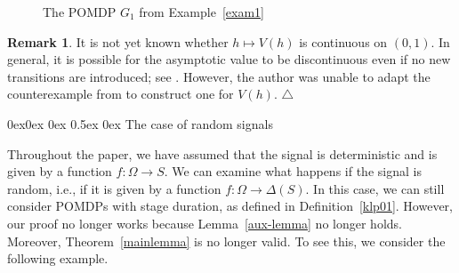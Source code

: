 \documentclass[english,openary,11pt]{article}
\makeatletter
\renewcommand\subsection{\@startsection{subsection}{2}{\z@}%
                                     {0ex\@plus 0ex \@minus 0ex}%
                                     {0.5ex \@plus 0ex}%
                                     {\normalfont\Large\bfseries}}%
\newcommand\xqed[1]{%
  \leavevmode\unskip\penalty9999 \hbox{}\nobreak\hfill
  \quad\hbox{#1}}
\newcommand\demo{\xqed{$\triangle$}}
\theoremstyle{definition}
\newtheorem{remark}{Remark}
\makeatother
\begin{document}
\begin{figure}[h]
	\large
    \centering 
    
    \caption{The POMDP $G_1$ from Example~\ref{exam1}}
    \label{fig1}
\end{figure}

\begin{remark}
It is not yet known whether $h \mapsto V(h)$ is continuous on $(0,1)$. In general, it is possible for the asymptotic value to be discontinuous even if no new transitions are introduced; see \cite[Proposition~3.11 and its proof]{Cha22}. However, the author was unable to adapt the counterexample from \cite{Cha22} to construct one for $V(h)$. \demo
\end{remark}

\subsection{The case of random signals}
\label{grana1}

Throughout the paper, we have assumed that the signal is deterministic and is given by a function $f : \Omega \to S$. We can examine what happens if the signal is random, i.e., if it is given by a function $f : \Omega \to \Delta(S)$. In this case, we can still consider POMDPs with stage duration, as defined in Definition~\ref{klp01}. However, our proof no longer works because Lemma~\ref{aux-lemma} no longer holds. Moreover, Theorem~\ref{mainlemma} is no longer valid. To see this, we consider the following example.
\end{document}
